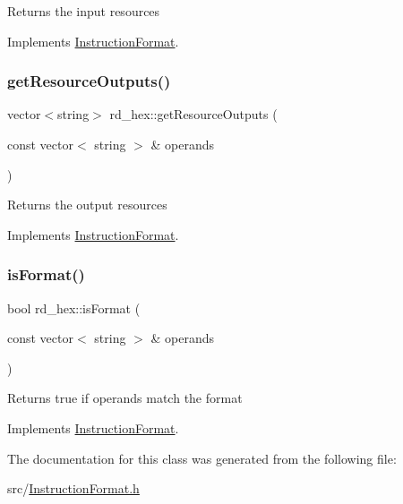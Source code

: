 Returns the input resources 

Implements \hyperlink{classInstructionFormat_a09775d3a3c22f40a0f44504664e586e4}{Instruction\+Format}.

\mbox{\label{classrd__hex_a5f437d79049848b5038272a70fb09cc3}} 
\subsubsection{\texorpdfstring{get\+Resource\+Outputs()}{getResourceOutputs()}}
{\footnotesize\ttfamily vector$<$string$>$ rd\+\_\+hex\+::get\+Resource\+Outputs (\begin{DoxyParamCaption}\item[{const vector$<$ string $>$ \&}]{operands }\end{DoxyParamCaption})\hspace{0.3cm}{\ttfamily [virtual]}}

Returns the output resources 

Implements \hyperlink{classInstructionFormat_a95cd28ffb1bde59b67f676880ab10536}{Instruction\+Format}.

\mbox{\label{classrd__hex_a9e91ce0f836feac13681445ef741edf2}} 
\subsubsection{\texorpdfstring{is\+Format()}{isFormat()}}
{\footnotesize\ttfamily bool rd\+\_\+hex\+::is\+Format (\begin{DoxyParamCaption}\item[{const vector$<$ string $>$ \&}]{operands }\end{DoxyParamCaption})\hspace{0.3cm}{\ttfamily [virtual]}}

Returns true if operands match the format 

Implements \hyperlink{classInstructionFormat_a9fdcf94dcd7d9a55ba86e7a63f04d1fe}{Instruction\+Format}.



The documentation for this class was generated from the following file\+:\begin{DoxyCompactItemize}
\item 
src/\hyperlink{InstructionFormat_8h}{Instruction\+Format.\+h}\end{DoxyCompactItemize}

